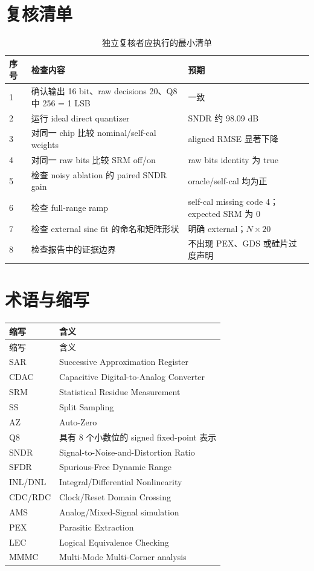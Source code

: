 \documentclass[UTF8,fontset=none,a4paper,11pt,openany]{ctexrep}
\begin{document}
\chapter{复核清单}

\begin{table}[H]
\centering
\caption{独立复核者应执行的最小清单}
\label{tab:review-checklist}
\begin{tabularx}{\textwidth}{p{}X p{}}
\toprule
序号 & 检查内容 & 预期\\
\midrule
1 & 确认输出 16 bit、raw decisions 20、Q8 中 256 = 1 LSB & 一致\\
2 & 运行 ideal direct quantizer & SNDR 约 98.09 dB\\
3 & 对同一 chip 比较 nominal/self-cal weights & aligned RMSE 显著下降\\
4 & 对同一 raw bits 比较 SRM off/on & raw bits identity 为 true\\
5 & 检查 noisy ablation 的 paired SNDR gain & oracle/self-cal 均为正\\
6 & 检查 full-range ramp & self-cal missing code 4；expected SRM 为 0\\
7 & 检查 external sine fit 的命名和矩阵形状 & 明确 external；$N\times20$\\
8 & 检查报告中的证据边界 & 不出现 PEX、GDS 或硅片过度声明\\
\bottomrule
\end{tabularx}
\end{table}

\chapter{术语与缩写}

\begin{longtable}{L{0.19\textwidth}L{0.70\textwidth}}
\toprule
缩写 & 含义\\
\midrule
\endfirsthead
\toprule
缩写 & 含义\\
\midrule
\endhead
SAR & Successive Approximation Register\\
CDAC & Capacitive Digital-to-Analog Converter\\
SRM & Statistical Residue Measurement\\
SS & Split Sampling\\
AZ & Auto-Zero\\
Q8 & 具有 8 个小数位的 signed fixed-point 表示\\
SNDR & Signal-to-Noise-and-Distortion Ratio\\
SFDR & Spurious-Free Dynamic Range\\
INL/DNL & Integral/Differential Nonlinearity\\
CDC/RDC & Clock/Reset Domain Crossing\\
AMS & Analog/Mixed-Signal simulation\\
PEX & Parasitic Extraction\\
LEC & Logical Equivalence Checking\\
MMMC & Multi-Mode Multi-Corner analysis\\
\bottomrule
\end{longtable}
\end{document}
